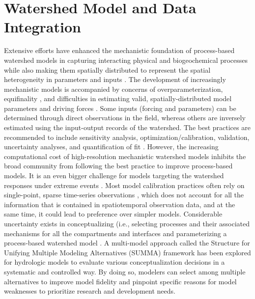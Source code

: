 \documentclass[preprint,review, 12pt]{elsarticle}
\begin{document}
\section{Watershed Model and Data Integration}

Extensive efforts have enhanced the mechanistic foundation of process-based watershed models in capturing interacting physical and biogeochemical processes while also making them spatially distributed to represent the spatial heterogeneity in parameters and inputs \citep{Wellen2015}. The development of increasingly mechanistic models is accompanied by concerns of overparameterization, equifinality \citep{Jackson-Blakea, Beven1992b, Beven2006}, and difficulties in estimating valid, spatially-distributed model parameters and driving forces \citep{Kollet2008b, Samaniego2010, Montanari2012, Raleigh2015, Raleigh2016a}. Some inputs (forcing and parameters) can be determined through direct observations in the field, whereas others are inversely estimated using the input-output records of the watershed. The best practices are recommended to include sensitivity analysis, optimization/calibration, validation, uncertainty analyses, and quantification of fit \citep{Chapra2008b}. However, the increasing computational cost of high-resolution mechanistic watershed models inhibits the broad community from following the best practice to improve process-based models. It is an even bigger challenge for models targeting the watershed responses under extreme events \citep{Wellen2015}. Most model calibration practices often rely on single-point, sparse time-series observations \citep{Wellen2015, Robson2014b}, which does not account for all the information that is contained in spatiotemporal observation data, and at the same time, it could lead to preference over simpler models. Considerable uncertainty exists in conceptualizing (i.e., selecting processes and their associated mechanisms for all the compartments and interfaces and parameterizing a process-based watershed model \citep{McDonnell2007, Duncan}. A multi-model approach called the Structure for Unifying Multiple Modeling Alternatives (SUMMA)\citep{Clark2015d, Clark2015a} framework has been explored for hydrologic models \citep{Clark2015d, Fenicia2011c, Clark2008b} to evaluate various conceptualization decisions in a systematic and controlled way. By doing so, modelers can select among multiple alternatives to improve model fidelity and pinpoint specific reasons for model weaknesses to prioritize research and development needs. 
\end{document}

